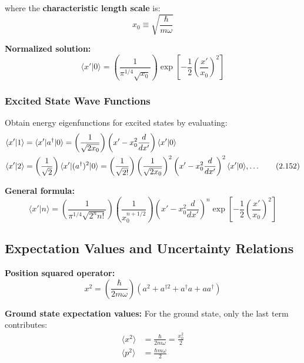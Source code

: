 \documentclass[11pt,a4paper]{article}
\begin{document}
where the \textbf{characteristic length scale} is:
\begin{equation}
\boxed{x_0 \equiv \sqrt{\frac{\hbar}{m\omega}}}
\tag{2.150}
\end{equation}

\textbf{Normalized solution:}
\begin{equation}
\boxed{\langle x'|0\rangle = \left(\frac{1}{\pi^{1/4}\sqrt{x_0}}\right)\exp\left[-\frac{1}{2}\left(\frac{x'}{x_0}\right)^2\right]}
\tag{2.151}
\end{equation}

\subsubsection{Excited State Wave Functions}

Obtain energy eigenfunctions for excited states by evaluating:
\begin{align}
\langle x'|1\rangle &= \langle x'|a^\dagger|0\rangle = \left(\frac{1}{\sqrt{2x_0}}\right)\left(x' - x_0^2\frac{d}{dx'}\right)\langle x'|0\rangle \notag \\
\langle x'|2\rangle &= \left(\frac{1}{\sqrt{2}}\right)\langle x'|(a^\dagger)^2|0\rangle = \left(\frac{1}{\sqrt{2!}}\right)\left(\frac{1}{\sqrt{2x_0}}\right)^2\left(x' - x_0^2\frac{d}{dx'}\right)^2\langle x'|0\rangle,\ldots
\tag{2.152}
\end{align}

\textbf{General formula:}
\begin{equation}
\boxed{\langle x'|n\rangle = \left(\frac{1}{\pi^{1/4}\sqrt{2^n n!}}\right)\left(\frac{1}{x_0^{n+1/2}}\right)\left(x' - x_0^2\frac{d}{dx'}\right)^n\exp\left[-\frac{1}{2}\left(\frac{x'}{x_0}\right)^2\right]}
\tag{2.153}
\end{equation}

\subsection{Expectation Values and Uncertainty Relations}

\textbf{Position squared operator:}
\begin{equation}
x^2 = \left(\frac{\hbar}{2m\omega}\right)(a^2 + a^{\dagger 2} + a^\dagger a + aa^\dagger)
\tag{2.154}
\end{equation}

\textbf{Ground state expectation values:}
For the ground state, only the last term contributes:
\begin{align}
\langle x^2\rangle &= \frac{\hbar}{2m\omega} = \frac{x_0^2}{2} \tag{2.155} \\
\langle p^2\rangle &= \frac{\hbar m\omega}{2} \tag{2.156}
\end{align}
\end{document}
